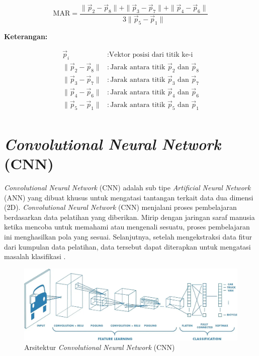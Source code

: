      \begin{equation}
    \label{rumus mar}
    \text{MAR} = \frac{\| \vec{p}_2 - \vec{p}_8 \| + \| \vec{p}_3 - \vec{p}_7 \| + \| \vec{p}_4 - \vec{p}_6 \| }{3 \| \vec{p}_5 - \vec{p}_1 \|}
\end{equation}


      \textbf{Keterangan:}
      
    \begin{align*}
        \vec{p}_i & : \text{Vektor posisi dari titik ke-i} \\
        \|\vec{p}_2 - \vec{p}_8\| & : \text{Jarak antara titik } \vec{p}_2 \text{ dan } \vec{p}_8 \\
        \|\vec{p}_3 - \vec{p}_7\| & : \text{Jarak antara titik } \vec{p}_3 \text{ dan } \vec{p}_7 \\
        \|\vec{p}_4 - \vec{p}_6\| & : \text{Jarak antara titik } \vec{p}_4 \text{ dan } \vec{p}_6 \\
        \|\vec{p}_5 - \vec{p}_1\| & : \text{Jarak antara titik } \vec{p}_5 \text{ dan } \vec{p}_1 \\
    \end{align*}



    

\section{\textit{Convolutional Neural Network} (CNN)}

    \textit{Convolutional Neural Network} (CNN) adalah sub tipe \textit{Artificial Neural Network} (ANN) yang
     dibuat khusus untuk mengatasi tantangan terkait data dua dimensi (2D). \textit{Convolutional Neural Network}
      (CNN) menjalani proses pembelajaran berdasarkan data pelatihan yang diberikan. Mirip dengan jaringan saraf
       manusia ketika mencoba untuk memahami atau mengenali sesuatu, proses pembelajaran ini menghasilkan pola
        yang sesuai. Selanjutnya, setelah mengekstraksi data fitur dari kumpulan data pelatihan, data tersebut
         dapat diterapkan untuk mengatasi masalah klasifikasi \cite{Alzubaidi2021}. 
    
  \begin{figure}[H]
      \centering
      \includegraphics[width=1\textwidth]{figures/bab2/arsitektur cnn.jpg}
      \caption{Arsitektur \textit{Convolutional Neural Network} (CNN) \cite{Prabhu}}
      \label{Arsitektur CNN}
    
    \end{figure}

